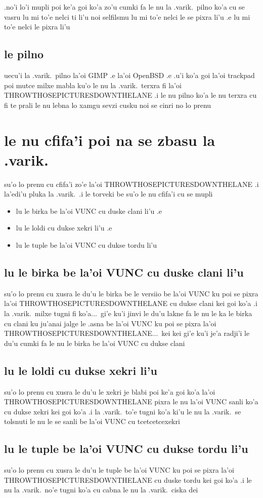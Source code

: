 \documentclass{report}
\begin{document}
.no'i lo'i mupli poi ke'a goi ko'a zo'u cumki fa le nu la .varik.\ pilno ko'a cu se vasru lu mi to'e nelci ti li'u noi selfilsmu lu mi to'e nelci le se pixra li'u .e lu mi to'e nelci le pixra li'u

\subsection{le pilno}
uecu'i la .varik.\ pilno la'oi GIMP .e la'oi OpenBSD .e .u'i ko'a goi la'oi trackpad poi mutce milxe mabla ku'o le nu la .varik.\ terxra fi la'oi THROWTHOSEPICTURESDOWNTHELANE  .i le nu pilno ko'a le nu terxra cu fi te prali le nu lebna lo xamgu sevzi cusku noi se cinri no lo prenu

\section{le nu cfifa'i poi na se zbasu la .varik.}
su'o lo prenu cu cfifa'i zo'e la'oi THROWTHOSEPICTURESDOWNTHELANE  .i la'edi'u pluka la .varik.\  .i le torveki be su'o le nu cfifa'i cu se mupli
\begin{itemize}
	\item lu le birka be la'oi VUNC cu duske clani li'u .e
	\item lu le loldi cu dukse xekri li'u .e
	\item lu le tuple be la'oi VUNC cu dukse tordu li'u
\end{itemize}

\subsection{lu le birka be la'oi VUNC cu duske clani li'u}
su'o lo prenu cu xusra le du'u le birka be le versiio be la'oi VUNC ku poi se pixra la'oi THROWTHOSEPICTURESDOWNTHELANE cu dukse clani kei goi ko'a  .i la .varik.\ milxe tugni fi ko'a...\ gi'e ku'i jinvi le du'u lakne fa le nu le ka le birka cu clani ku ju'anai jalge le .asna be la'oi VUNC ku poi se pixra la'oi THROWTHOSEPICTURESDOWNTHELANE...\ kei kei gi'e ku'i je'a radji'i le du'u cumki fa le nu le birka be la'oi VUNC cu dukse clani

\subsection{lu le loldi cu dukse xekri li'u}
su'o lo prenu cu xusra le du'u le xekri je blabi poi ke'a goi ko'a la'oi THROWTHOSEPICTURESDOWNTHELANE pixra le nu la'oi VUNC sanli ko'a cu dukse xekri kei goi ko'a  .i la .varik.\ to'e tugni ko'a ki'u le nu la .varik.\ se tolsnuti le nu le se sanli be la'oi VUNC cu tcetcetcexekri

\subsection{lu le tuple be la'oi VUNC cu dukse tordu li'u}
su'o lo prenu cu xusra le du'u le tuple be la'oi VUNC ku poi se pixra la'oi THROWTHOSEPICTURESDOWNTHELANE cu duske tordu kei goi ko'a  .i le nu la .varik.\ no'e tugni ko'a cu cabna le nu la .varik.\ ciska dei
\end{document}
